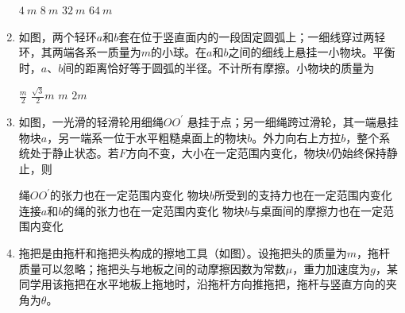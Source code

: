 \begin{enumerate}
\begin{minipage}[h!]{0.7\linewidth}
\vspace{0.3em}
\fourchoices
{$ 4 \ m $}
{$ 8 \ m $}
{$ 32 \ m $}
{$ 64 \ m $}
\vspace{0.3em}
\end{minipage}
\hfill
\begin{minipage}[h!]{0.3\linewidth}
\flushright
\vspace{0.3em}

\vspace{0.3em}
\end{minipage}


\item 
{}
如图，两个轻环$ a $和$ b $套在位于竖直面内的一段固定圆弧上；一细线穿过两轻环，其两端各系一质量为$ m $的小球。在$ a $和$ b $之间的细线上悬挂一小物块。平衡时，$ a $、$ b $间的距离恰好等于圆弧的半径。不计所有摩擦。小物块的质量为  
\begin{figure}[h!]
\centering

\end{figure}


\fourchoices
{$ \frac { m } { 2 } $}
{$ \frac { \sqrt { 3 } } { 2 } m $}
{$ m $}
{$ 2 m $}




\item 
{}
如图，一光滑的轻滑轮用细绳$ OO ^{\prime} $ 悬挂于点；另一细绳跨过滑轮，其一端悬挂物块$ a $，另一端系一位于水平粗糙桌面上的物块$ b $。外力向右上方拉$ b $，整个系统处于静止状态。若$ F $方向不变，大小在一定范围内变化，物块$ b $仍始终保持静止，则  
\begin{figure}[h!]
\centering

\end{figure}


\fourchoices
{绳$ OO ^{\prime} $的张力也在一定范围内变化}
{物块$ b $所受到的支持力也在一定范围内变化}
{连接$ a $和$ b $的绳的张力也在一定范围内变化}
{物块$ b $与桌面间的摩擦力也在一定范围内变化}




\item 
{}
拖把是由拖杆和拖把头构成的擦地工具（如图）。设拖把头的质量为$ m $，拖杆质量可以忽略；拖把头与地板之间的动摩擦因数为常数$ \mu $，重力加速度为$ g $，某同学用该拖把在水平地板上拖地时，沿拖杆方向推拖把，拖杆与竖直方向的夹角为$ \theta $。
\begin{enumerate}
\renewcommand{\labelenumii}{(\arabic{enumii})}


\end{enumerate}
\end{enumerate}
